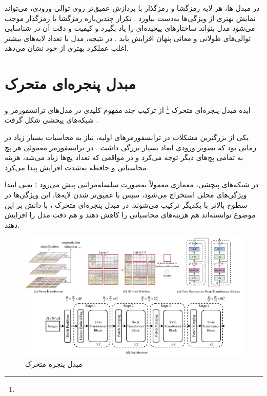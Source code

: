در مبدل ها، هر لایه رمزگشا و رمزگذار با پردازش عمیق‌تر روی توالی ورودی، می‌تواند نمایش بهتری از ویژگی‌ها به‌دست بیاورد \cite{vaswani2017attention}. تکرار چندین‌باره رمزگشا یا رمزگذار موجب می‌شود مدل بتواند ساختارهای پیچیده‌ای را یاد بگیرد و کیفیت و دقت آن در شناسایی توالی‌های طولانی و معانی پنهان افزایش یابد \cite{vaswani2017attention,dosovitskiy2020image}. 
در نتیجه، مدل با تعداد لایه‌های بیشتر اغلب عملکرد بهتری از خود نشان می‌دهد.

   
   
\section{مبدل پنجره‌ای متحرک}
ایده مبدل پنجره‌ای متحرک \footnote{} از ترکیب چند مفهوم کلیدی در مدل‌های ترانسفورمر و شبکه‌های پیچشی شکل گرفت \cite{vaswani2017attention,he2016deep,liu2021swintransformer}.

یکی از بزرگترین مشکلات در ترانسفورمرهای اولیه، نیاز به محاسبات بسیار زیاد در زمانی بود که تصویر ورودی ابعاد بسیار بزرگی داشت \cite{dosovitskiy2020image}. در ترانسفورمر معمولی هر پچ به تمامی پچ‌های دیگر توجه  می‌کرد و در مواقعی که تعداد پچ‌ها زیاد می‌شد، هزینه محاسباتی و حافظه به‌شدت افزایش پیدا می‌کرد.

در شبکه‌های پیچشی، معماری معمولاً به‌صورت سلسله‌مراتبی پیش می‌رود \cite{he2016deep}؛ یعنی ابتدا ویژگی‌های محلی استخراج می‌شود، سپس با عمیق‌تر شدن لایه‌ها، این ویژگی‌ها در سطوح بالاتر با یکدیگر ترکیب می‌شوند. در مبدل پنجره‌ای متحرک \cite{liu2021swintransformer}، با دانش بر این موضوع توانسته‌اند هم هزینه‌های محاسباتی را کاهش دهند و هم دقت مدل را افزایش دهند.

\begin{figure}[h]
	\centering
	\begin{minipage}[b]{1\textwidth}
		\centering
		\includegraphics[width=\textwidth]{transformer_images/swin_transformer.png}
		\caption{مبدل پنجره متحرک}
		\label{fig: swin transformer}
	\end{minipage}
	\hfill
\end{figure}

